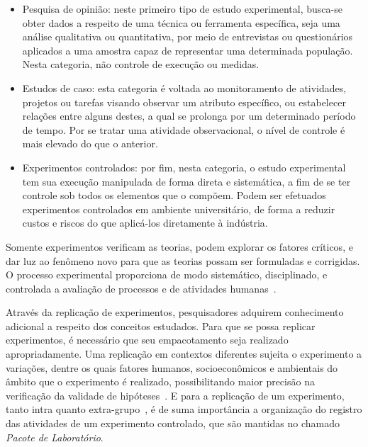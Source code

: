 \begin{itemize}

\item Pesquisa de opinião: neste primeiro tipo de estudo experimental, busca-se obter dados a respeito de uma técnica ou ferramenta específica, seja uma análise qualitativa ou quantitativa, por meio de entrevistas ou questionários aplicados a uma amostra capaz de representar uma determinada população. Nesta categoria, não controle de execução ou medidas.

\item Estudos de caso: esta categoria é voltada ao monitoramento de atividades, projetos ou tarefas visando observar um atributo específico, ou estabelecer relações entre alguns destes, a qual se prolonga por um determinado período de tempo. Por se tratar uma atividade observacional, o nível de controle é mais elevado do que o anterior.

\item Experimentos controlados: por fim, nesta categoria, o estudo experimental tem sua execução manipulada de forma direta e sistemática, a fim de se ter controle sob todos os elementos que o compõem. Podem ser efetuados experimentos controlados em ambiente universitário, de forma a reduzir custos e riscos do que aplicá-los diretamente à indústria.

\end{itemize}

Somente experimentos verificam as teorias, podem explorar os fatores críticos, e dar luz ao fenômeno novo para que as teorias possam ser formuladas e corrigidas. O processo experimental proporciona de modo sistemático, disciplinado, e controlada a avaliação de processos e de atividades humanas~\cite{Travassos02}.

Através da replicação de experimentos, pesquisadores adquirem conhecimento adicional a respeito dos conceitos estudados. Para que se possa replicar experimentos, é necessário que seu empacotamento seja realizado apropriadamente. Uma replicação em contextos diferentes sujeita o experimento a variações, dentre os quais fatores humanos, socioeconômicos e ambientais do âmbito que o experimento é realizado, possibilitando maior precisão na verificação da validade de hipóteses~\cite{Shull03}. E para a replicação de um experimento, tanto intra quanto extra-grupo~\cite{Mendonca08}, é de suma importância a organização do registro das atividades de um experimento controlado, que são mantidas no chamado \textit{Pacote de Laboratório}.

